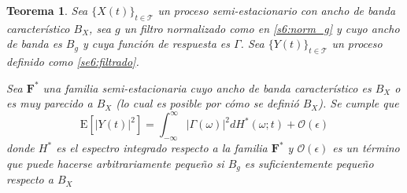\documentclass[12pt,letterpaper,draft]{book}
\newtheorem{teorema}{Teorema}[chapter]
\newcommand{\intR}{\int_{-\infty}^{\infty}}
\newcommand{\ef}{\mathbf{F}}
\newcommand{\efstar}{\ef^{\boldsymbol{*}}}
\newcommand{\E}[1]{\mathrm{E}\left[ #1 \right]}
\newcommand{\abso}[1]{\left| #1 \right|}
\newcommand{\xt}{$\{X(t)\}_{t\in \mathcal{T}}$ }
\newcommand{\orden}[1]{\mathcal{O}\left( #1 \right)}
\begin{document}
\begin{teorema}
Sea \xt un proceso semi-estacionario con ancho de banda característico $B_X$, sea $g$ un filtro normalizado como en \ref{s6:norm_g} y cuyo ancho de banda es $B_g$ y cuya función de respuesta es $\Gamma$. 
%
Sea $\{Y(t)\}_{t\in \mathcal{T}}$ un proceso definido como \ref{se6:filtrado}.

Sea $\efstar$ una familia semi-estacionaria cuyo ancho de banda característico es $B_X$ o es muy parecido a $B_X$ (lo cual es posible por cómo se definió $B_X$).
%
Se cumple que
\begin{equation}
\E{\abso{Y(t)}^{2}} = \intR \abso{\Gamma(\omega)}^{2} dH^{*}(\omega; t) + \orden{\epsilon}
\end{equation}
donde $H^{*}$ es el espectro integrado respecto a la familia $\efstar$ y $\orden{\epsilon}$ es un término que puede hacerse arbitrariamente pequeño si $B_g$ es suficientemente pequeño respecto a $B_X$
\label{teo:aprox_orden}
\end{teorema}
\end{document}
